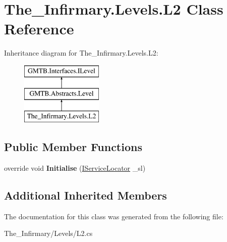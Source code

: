 \hypertarget{class_the___infirmary_1_1_levels_1_1_l2}{}\section{The\+\_\+\+Infirmary.\+Levels.\+L2 Class Reference}
\label{class_the___infirmary_1_1_levels_1_1_l2}
Inheritance diagram for The\+\_\+\+Infirmary.\+Levels.\+L2\+:\begin{figure}[H]
\begin{center}
\leavevmode
\includegraphics[height=3.000000cm]{class_the___infirmary_1_1_levels_1_1_l2}
\end{center}
\end{figure}
\subsection*{Public Member Functions}
\begin{DoxyCompactItemize}
\item 
\mbox{\label{class_the___infirmary_1_1_levels_1_1_l2_adc921dbddf3cfb4274bbebb61d551c41}} 
override void {\bfseries Initialise} (\mbox{\hyperlink{interface_g_m_t_b_1_1_interfaces_1_1_i_service_locator}{I\+Service\+Locator}} \+\_\+sl)
\end{DoxyCompactItemize}
\subsection*{Additional Inherited Members}


The documentation for this class was generated from the following file\+:\begin{DoxyCompactItemize}
\item 
The\+\_\+\+Infirmary/\+Levels/L2.\+cs\end{DoxyCompactItemize}
